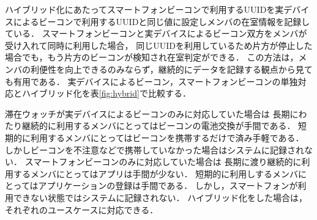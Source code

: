 ハイブリッド化にあたってスマートフォンビーコンで利用するUUIDを実デバイスによるビーコンで利用するUUIDと同じ値に設定しメンバの在室情報を記録している．
スマートフォンビーコンと実デバイスによるビーコン双方をメンバが受け入れて同時に利用した場合，
同じUUIDを利用しているため片方が停止した場合でも，もう片方のビーコンが検知され在室判定ができる．
この方法は，メンバの利便性を向上できるのみならず，継続的にデータを記録する観点から見ても有用である．
実デバイスによるビーコン，スマートフォンビーコンの単独対応とハイブリッド化を表\ref{fig:hybrid}で比較する．

 滞在ウォッチが実デバイスによるビーコンのみに対応していた場合は
長期にわたり継続的に利用するメンバにとってはビーコンの電池交換が手間である．
短期的に利用するメンバにとってはビーコンを携帯するだけで済み手軽である．
しかしビーコンを不注意などで携帯していなかった場合はシステムに記録されない．
スマートフォンビーコンのみに対応していた場合は
長期に渡り継続的に利用するメンバにとってはアプリは手間が少ない．
短期的に利用しするメンバにとってはアプリケーションの登録は手間である．
しかし，スマートフォンが利用できない状態ではシステムに記録されない．
ハイブリッド化をした場合は，それぞれのユースケースに対応できる．

